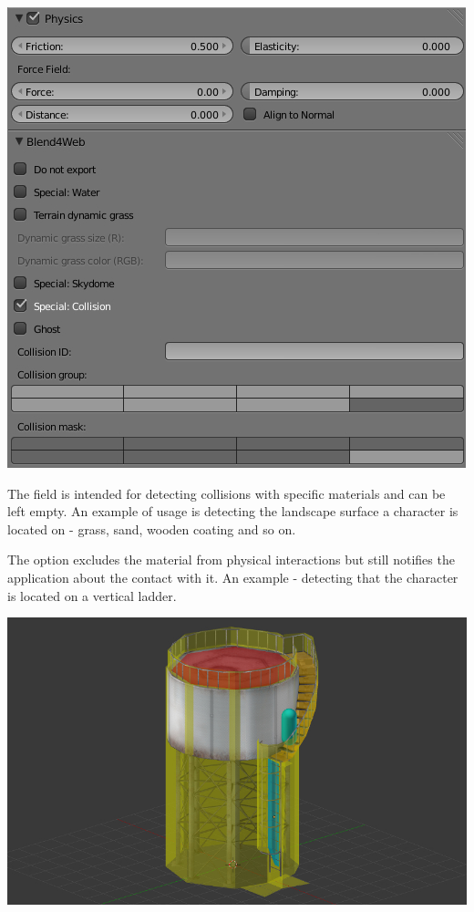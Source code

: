 \documentclass[a4paper,12pt,oneside]{sphinxmanual}
\begin{document}
\includegraphics[width=1.000\linewidth]{material_panel_physics.jpg}

\begin{DUlineblock}{0em}
\item[] 
\end{DUlineblock}

The  field is intended for detecting collisions with specific materials and can be left empty. An example of  usage is detecting the landscape surface a character is located on - grass, sand, wooden coating and so on.

The  option excludes the material from physical interactions but still notifies the application about the contact with it. An example - detecting that the character is located on a vertical ladder.

\includegraphics[width=1.000\linewidth]{physics_water_tower.jpg}
\end{document}
